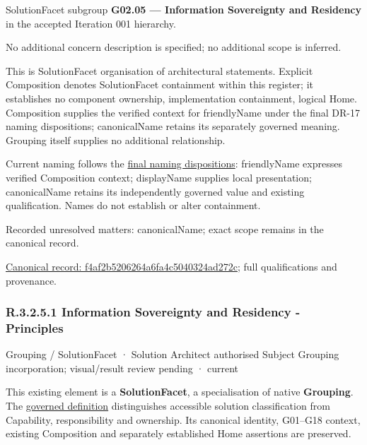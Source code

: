 SolutionFacet subgroup \textbf{G02.05 — Information Sovereignty and Residency} in the accepted Iteration 001 hierarchy.



No additional concern description is specified; no additional scope is inferred.



This is SolutionFacet organisation of architectural statements. Explicit Composition denotes SolutionFacet containment within this register; it establishes no component ownership, implementation containment, logical Home. Composition supplies the verified context for friendlyName under the final DR-17 naming dispositions; canonicalName retains its separately governed meaning. Grouping itself supplies no additional relationship.



Current naming follows the \href{\detokenize{../../../../../../../governance/canonical-identity-and-naming.md#solutionfacet-naming-roles--dr-17-final-dispositions}}{final naming dispositions}: friendlyName expresses verified Composition context; displayName supplies local presentation; canonicalName retains its independently governed value and existing qualification. Names do not establish or alter containment.


{\small Recorded unresolved matters: canonicalName; exact scope remains in the canonical record.}\par
{\footnotesize \href{../../../../../../../continuum/grouping/f4af2b5206264a6fa4c5040324ad272c.md}{Canonical record: f4af2b5206264a6fa4c5040324ad272c}; full qualifications and provenance.}\par
\subsubsection*{R.3.2.5.1 Information Sovereignty and Residency - Principles}
\label{navigation:R.3.2.5.1}

\label{element:f6b8d4c19f9649a0bdde6727182855b6}
{\small Grouping / SolutionFacet · Solution Architect authorised Subject Grouping incorporation; visual/result review pending · current}\par

This existing element is a \textbf{SolutionFacet}, a specialisation of native
\textbf{Grouping}. The \href{\detokenize{../../../../../../../governance/continuum-representation.md#solutionfacet-classification--1119-candidate}}{governed definition}
distinguishes accessible solution classification from Capability, responsibility
and ownership. Its canonical identity, G01–G18 context, existing Composition
and separately established Home assertions are preserved.



